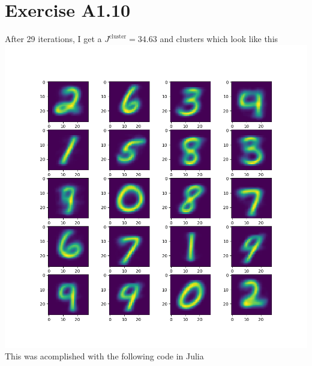\section*{Exercise A1.10}
After 29 iterations, I get a $J^{\text{cluster}}=34.63$ and clusters which look like this
\includegraphics[scale=0.5]{digits.png}
This was acomplished with the following code in Julia


